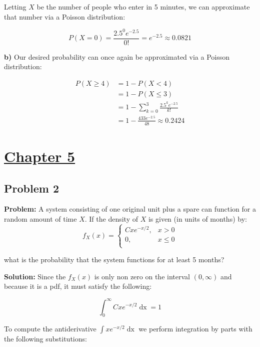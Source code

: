 \documentclass{article}
\begin{document}
Letting $X$ be the number of people who enter in 5 minutes, we can approximate that number via a Poisson distribution:

\begin{equation*}
    P(X=0)=\frac{2.5^0e^{-2.5}}{0!}=e^{-2.5}\approx0.0821
\end{equation*}

\textbf{b)} Our desired probability can once again be approximated via a Poisson distribution:

\begin{align*}
    P(X\ge4)&=1-P(X<4)\tag{complement of inequality}\\
    &=1-P(X\le 3)\tag{discrete random variable}\\
    &=1-\sum_{k=0}^3\frac{2.5^ke^{-2.5}}{k!}\tag{Poisson distribution}\\
    &=1-\frac{433e^{-2.5}}{48}\approx0.2424
\end{align*}

\section*{\underline{Chapter 5}}

\subsection*{Problem 2}
\noindent\textbf{Problem:} A system consisting of one original unit plus a spare can function for a random amount of time $X$. If the density of $X$ is given (in units of months) by:
\begin{equation*}
    f_X(x)=\begin{cases}
        Cxe^{-x/2},&x>0\\
        0,&x\le0\\
    \end{cases}
\end{equation*}

what is the probability that the system functions for at least 5 months?
\bigskip

\noindent\textbf{Solution:} Since the $f_X(x)$ is only non zero on the interval $(0,\infty)$ and because it is a pdf, it must satisfy the following:

\begin{equation*}
    \int_0^\infty Cxe^{-x/2}\mathop{dx}=1
\end{equation*}

To compute the antiderivative $\int xe^{-x/2}\mathop{dx}$ we perform integration by parts with the following substitutions:
\end{document}
